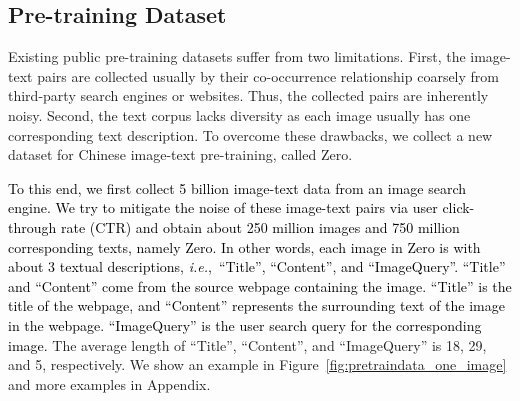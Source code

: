\documentclass[sigconf]{acmart}
\def\ie{\mbox{\textit{i.e.}, }}
\def\mmxie{\textcolor{black}}
\def\mmljc{\textcolor{black}}
\def\pretraindata{Zero}
\begin{document}
\subsection{Pre-training Dataset}\label{sec pretraindata}
Existing public pre-training datasets suffer from two limitations.
First, the image-text pairs are collected usually by their co-occurrence relationship coarsely from third-party search engines or websites. Thus, the collected pairs are inherently noisy.
Second, the text corpus lacks diversity as each image usually has one corresponding text description. 
To overcome these drawbacks, we collect a new dataset for Chinese image-text pre-training, called \pretraindata{}.



\mmljc{To this end, we first collect 5 billion image-text data from an image search engine. We try to mitigate the noise of these image-text pairs via user click-through rate (CTR) and obtain about 250 million images and 750 million corresponding texts, namely \pretraindata{}. In other words, each image in \pretraindata{} is with about 3 textual descriptions, \ie ``Title'', ``Content'', and ``ImageQuery''.}
\mmxie{``Title'' and ``Content'' come from the source webpage containing the image. ``Title'' is the title of the webpage, and ``Content'' represents the surrounding text of the image in the webpage.
``ImageQuery'' is the user search query for the corresponding image.}
The average length of ``Title'', ``Content'', and ``ImageQuery'' is 18, 29, and 5, respectively.
We show an example in Figure~\ref{fig:pretraindata_one_image} and more examples in Appendix.
\end{document}
